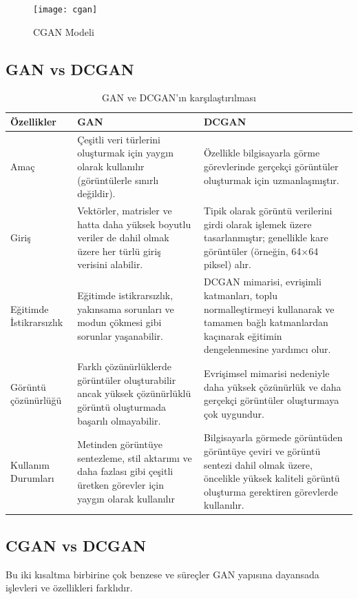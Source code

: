 \documentclass[12pt, a4paper]{article}
\begin{document}
	\begin{figure}[h]
		\centering
		\texttt{[image: cgan]}
		\label{cgan}
		\caption{CGAN Modeli\cite{Train-2024-05-06}}
	\end{figure}
	\FloatBarrier
	\clearpage
	\subsection{GAN vs DCGAN}
	
	\begin{table}[!ht]
		\centering
		\caption{GAN ve DCGAN'ın karşılaştırılması\cite{GAN-2024-05-08}}
		\label{tab:trigo}
		\begin{tabular}{|p{2cm}|p{7cm}|p{6cm}|}
			\hline
			Özellikler& GAN      & DCGAN         \\\hline
			Amaç      & Çeşitli veri türlerini oluşturmak için yaygın olarak kullanılır (görüntülerle sınırlı değildir).        & Özellikle bilgisayarla görme görevlerinde gerçekçi görüntüler oluşturmak için uzmanlaşmıştır.     \\\hline
			Giriş     & Vektörler, matrisler ve hatta daha yüksek boyutlu veriler de dahil olmak üzere her türlü giriş verisini alabilir.        & Tipik olarak görüntü verilerini girdi olarak işlemek üzere tasarlanmıştır; genellikle kare görüntüler (örneğin, 64×64 piksel) alır.   \\\hline
			Eğitimde İstikrarsızlık  & Eğitimde istikrarsızlık, yakınsama sorunları ve modun çökmesi gibi sorunlar yaşanabilir. & DCGAN mimarisi, evrişimli katmanları, toplu normalleştirmeyi kullanarak ve tamamen bağlı katmanlardan kaçınarak eğitimin dengelenmesine yardımcı olur.   \\\hline
			Görüntü çözünürlüğü	& 	Farklı çözünürlüklerde görüntüler oluşturabilir ancak yüksek çözünürlüklü görüntü oluşturmada başarılı olmayabilir.        & Evrişimsel mimarisi nedeniyle daha yüksek çözünürlük ve daha gerçekçi görüntüler oluşturmaya çok uygundur.            \\\hline
			Kullanım Durumları& Metinden görüntüye sentezleme, stil aktarımı ve daha fazlası gibi çeşitli üretken görevler için yaygın olarak kullanılır         & Bilgisayarla görmede görüntüden görüntüye çeviri ve görüntü sentezi dahil olmak üzere, öncelikle yüksek kaliteli görüntü oluşturma gerektiren görevlerde kullanılır.              \\\hline
		\end{tabular}
	\end{table}
	\FloatBarrier
	
	\subsection{CGAN vs DCGAN}
	Bu iki kısaltma birbirine çok benzese ve süreçler GAN yapısına dayansada işlevleri ve özellikleri farklıdır. 
	
\end{document}
